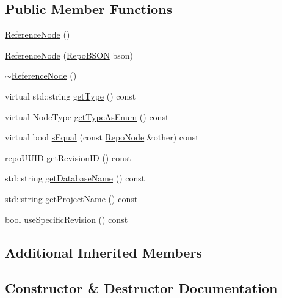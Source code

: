 \subsection*{Public Member Functions}
\begin{DoxyCompactItemize}
\item 
\hyperlink{classrepo_1_1core_1_1model_1_1_reference_node_a36cce27b04a4d55b7c09cb6ab478ce8a}{Reference\+Node} ()
\item 
\hyperlink{classrepo_1_1core_1_1model_1_1_reference_node_a320a317c1892981e028c1d9d04d890f4}{Reference\+Node} (\hyperlink{classrepo_1_1core_1_1model_1_1_repo_b_s_o_n}{Repo\+B\+S\+O\+N} bson)
\item 
\hyperlink{classrepo_1_1core_1_1model_1_1_reference_node_a909cd607b7faa7b319c7c5dfef84cf9d}{$\sim$\+Reference\+Node} ()
\item 
virtual std\+::string \hyperlink{classrepo_1_1core_1_1model_1_1_reference_node_a1f1b1c966eb936b31b92f05247df58d0}{get\+Type} () const 
\item 
virtual Node\+Type \hyperlink{classrepo_1_1core_1_1model_1_1_reference_node_abe69afbcb44f14ad6a9a821819a2cf85}{get\+Type\+As\+Enum} () const 
\item 
virtual bool \hyperlink{classrepo_1_1core_1_1model_1_1_reference_node_abc948b4ed5437871142d57498a12cf2d}{s\+Equal} (const \hyperlink{classrepo_1_1core_1_1model_1_1_repo_node}{Repo\+Node} \&other) const 
\item 
repo\+U\+U\+I\+D \hyperlink{classrepo_1_1core_1_1model_1_1_reference_node_ad3ddd679d4da323c1a8a8ad0aa3077ce}{get\+Revision\+I\+D} () const 
\item 
std\+::string \hyperlink{classrepo_1_1core_1_1model_1_1_reference_node_a2e26797f48595031dc2dbc249cae6e07}{get\+Database\+Name} () const 
\item 
std\+::string \hyperlink{classrepo_1_1core_1_1model_1_1_reference_node_a75be3b6d6b19c190cdfa1bb412cecf4c}{get\+Project\+Name} () const 
\item 
bool \hyperlink{classrepo_1_1core_1_1model_1_1_reference_node_a8b2e959a6af066cb89f0c734e5debe39}{use\+Specific\+Revision} () const 
\end{DoxyCompactItemize}
\subsection*{Additional Inherited Members}


\subsection{Constructor \& Destructor Documentation}
\hypertarget{classrepo_1_1core_1_1model_1_1_reference_node_a36cce27b04a4d55b7c09cb6ab478ce8a}{}
